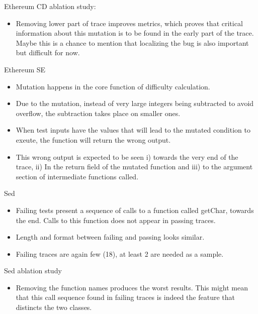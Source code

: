Ethereum CD ablation study:
\begin{itemize}
\item Removing lower part of trace improves metrics, which proves that critical information about this mutation is to be found in the early part of the trace. Maybe this is a chance to mention that localizing the bug is also important but difficult for now.
\end{itemize}

Ethereum SE
\begin{itemize}
\item Mutation happens in the core function of difficulty calculation.
\item Due to the mutation, instead of very large integers being subtracted to avoid overflow, the subtraction takes place on smaller ones.
\item When test inputs have the values that will lead to the mutated condition to exeute, the function will return the wrong output.
\item This wrong output is expected to be seen i) towards the very end of the trace, ii) In the return field of the mutated function and iii) to the argument section of intermediate functions called.
\end{itemize}

Sed
\begin{itemize}
\item Failing tests present a sequence of calls to a function called getChar, towards the end. Calls to this function does not appear in passing traces.
\item Length and format between failing and passing looks similar.
\item Failing traces are again few (18), at least 2 are needed as a sample.
\end{itemize}

Sed ablation study
\begin{itemize}
\item Removing the function names produces the worst results. This might mean that this call sequence found in failing traces is indeed the feature that distincts the two classes.
\end{itemize}

\fi
